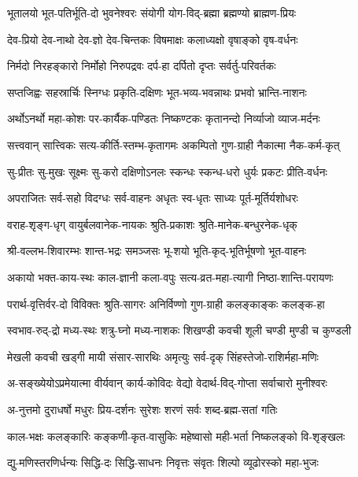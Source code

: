 \twolineshloka
{भूतालयो भूत-पतिर्भूति-दो भुवनेश्वरः}
{संयोगी योग-विद्-ब्रह्मा ब्रह्मण्यो ब्राह्मण-प्रियः}

\twolineshloka
{देव-प्रियो देव-नाथो देव-ज्ञो देव-चिन्तकः}
{विषमाक्षः कलाध्यक्षो वृषाङ्को वृष-वर्धनः}

\twolineshloka
{निर्मदो निरहङ्कारो निर्मोहो निरुपद्रवः}
{दर्प-हा दर्पितो दृप्तः सर्वर्तु-परिवर्तकः}

\twolineshloka
{सप्तजिह्वः सहस्रार्चिः स्निग्धः प्रकृति-दक्षिणः}
{भूत-भव्य-भवन्नाथः प्रभवो भ्रान्ति-नाशनः}

\twolineshloka
{अर्थोऽनर्थो महा-कोशः पर-कार्यैक-पण्डितः}
{निष्कण्टकः कृतानन्दो निर्व्याजो व्याज-मर्दनः}

\twolineshloka
{सत्त्ववान् सात्त्विकः सत्य-कीर्ति-स्तम्भ-कृतागमः}
{अकम्पितो गुण-ग्राही नैकात्मा नैक-कर्म-कृत्}

\twolineshloka
{सु-प्रीतः सु-मुखः सूक्ष्मः सु-करो दक्षिणोऽनलः}
{स्कन्धः स्कन्ध-धरो धुर्यः प्रकटः प्रीति-वर्धनः}

\twolineshloka
{अपराजितः सर्व-सहो विदग्धः सर्व-वाहनः}
{अधृतः स्व-धृतः साध्यः पूर्त-मूर्तिर्यशोधरः}

\twolineshloka
{वराह-शृङ्ग-धृग् वायुर्बलवानेक-नायकः}
{श्रुति-प्रकाशः श्रुति-मानेक-बन्धुरनेक-धृक्}

\twolineshloka
{श्री-वल्लभ-शिवारम्भः शान्त-भद्रः समञ्जसः}
{भू-शयो भूति-कृद्-भूतिर्भूषणो भूत-वाहनः}

\twolineshloka
{अकायो भक्त-काय-स्थः काल-ज्ञानी कला-वपुः}
{सत्य-व्रत-महा-त्यागी निष्ठा-शान्ति-परायणः}

\twolineshloka
{परार्थ-वृत्तिर्वर-दो विविक्तः श्रुति-सागरः}
{अनिर्विण्णो गुण-ग्राही कलङ्काङ्कः कलङ्क-हा}

\twolineshloka
{स्वभाव-रुद्-द्रो मध्य-स्थः शत्रु-घ्नो मध्य-नाशकः}
{शिखण्डी कवची शूली चण्डी मुण्डी च कुण्डली}

\twolineshloka
{मेखली कवची खड्गी मायी संसार-सारथिः}
{अमृत्युः सर्व-दृक् सिंहस्तेजो-राशिर्महा-मणिः}

\twolineshloka
{अ-सङ्ख्येयोऽप्रमेयात्मा वीर्यवान् कार्य-कोविदः}
{वेद्यो वेदार्थ-विद्-गोप्ता सर्वाचारो मुनीश्वरः}

\twolineshloka
{अ-नुत्तमो दुराधर्षो मधुरः प्रिय-दर्शनः}
{सुरेशः शरणं सर्वः शब्द-ब्रह्म-सतां गतिः}

\twolineshloka
{काल-भक्षः कलङ्कारिः कङ्कणी-कृत-वासुकिः}
{महेष्वासो मही-भर्ता निष्कलङ्को वि-शृङ्खलः}

\twolineshloka
{द्यु-मणिस्तरणिर्धन्यः सिद्धि-दः सिद्धि-साधनः}
{निवृत्तः संवृतः शिल्पो व्यूढोरस्को महा-भुजः}

